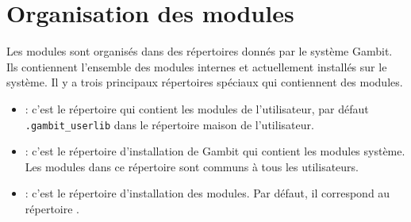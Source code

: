 

\section{Organisation des modules}

Les modules sont organisés dans des répertoires donnés par le système Gambit.
Ils contiennent l'ensemble des modules internes et actuellement installés sur
le système. Il y a trois principaux répertoires spéciaux qui contiennent des
modules.

\begin{itemize}
  \item {}: c'est le répertoire qui contient les modules
    de l'utilisateur, par défaut \texttt{.gambit\_userlib} dans le répertoire
    maison de l'utilisateur.

  \item {}: c'est le répertoire d'installation de Gambit
    qui contient les modules système. Les modules dans ce répertoire sont
    communs à tous les utilisateurs.

  \item {}: c'est le répertoire d'installation des modules.
    Par défaut, il correspond au répertoire .
\end{itemize}

